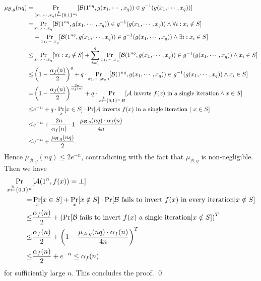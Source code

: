 \begin{align*}
\mu_{\mathcal{B},g}(nq) =& \Pr_{(x_1, \cdots, x_q) \stackrel{\$}{\leftarrow} \{0,1\}^{nq}}[ \mathcal{B}(1^{nq}, g(x_1, \cdots, x_q)) \in g^{-1}(g(x_1, \cdots, x_q))]\\
=&  \Pr_{x_1, \cdots, x_q}[ \mathcal{B}(1^{nq}, g(x_1, \cdots, x_q)) \in g^{-1}(g(x_1, \cdots, x_q)) \wedge \forall i: x_i \notin S]\\
& + \Pr_{x_1, \cdots, x_q}[ \mathcal{B}(1^{nq}, g(x_1, \cdots, x_q)) \in g^{-1}(g(x_1, \cdots, x_q)) \wedge \exists i: x_i \in S]\\
\leq& \Pr_{x_1, \cdots, x_q}[ \forall i: x_i \notin S]
+ \sum_{i=1}^q \Pr_{x_1, \cdots, x_q}[ \mathcal{B}(1^{nq}, g(x_1, \cdots, x_q)) \in g^{-1}(g(x_1, \cdots, x_q)) \wedge  x_i \in S]\\
\leq& \left( 1-\frac{\alpha_f(n)}{2}\right)^q
+ q \cdot \Pr_{x_1, \cdots, x_q,i}[ \mathcal{B}(1^{nq}, g(x_1, \cdots, x_q)) \in g^{-1}(g(x_1, \cdots, x_q)) \wedge x_i \in S] \\
=& \left( 1-\frac{\alpha_f(n)}{2}\right)^{\frac{2n}{\alpha_f(n)}}
+  q\cdot \Pr_{x \stackrel{\$}{\leftarrow} \{0,1\}^{n}, \mathcal{B}}[\mathcal{A} \text{ inverts $f(x)$ in a single iteration}  \wedge x \in S]\\
\leq& e^{-n} + q\cdot  \Pr_{x}[x \in S] \cdot \Pr[\mathcal{A} \text{ inverts $f(x)$ in a single iteration} ~|~ x \in S]\\
\leq& e^{-n} + \frac{2n}{\alpha_f(n)} \cdot  1 \cdot \frac{\mu_{\mathcal{B},g}(nq) \cdot \alpha_f(n)}{4n}\\
\leq& e^{-n} + \frac{\mu_{\mathcal{B},g}(nq)}{2}.
\end{align*}
Hence $\mu_{\mathcal{B},g}(nq) \leq 2 e^{-n}$, contradicting with the fact that $\mu_{\mathcal{B},g}$ is non-negligible.
Then we have
\begin{align*}
\Pr_{x \stackrel{\$}{\leftarrow} \{0,1\}^{n}}&[ \mathcal{A}(1^n, f(x)) = \bot]\\
=& \Pr_x[x \in S] + \Pr_x [x \notin S]\cdot\Pr[\mathcal{B} \text{ fails to invert $f(x)$ in every iteration} | x \notin S]\\
\leq& \frac{\alpha_f(n)}{2}+ \left(\Pr[ \mathcal{B} \text{ fails to invert $f(x)$ a single iteration} | x \notin S] \right)^T\\
\leq & \frac{\alpha_f(n)}{2}+ \left( 1-\frac{\mu_{\mathcal{A},g}(nq) \cdot \alpha_f(n)}{4n}\right)^T\\
\leq& \frac{\alpha_f(n)}{2} + e^{-n} \leq \alpha_f(n)
\end{align*}
for sufficiently large $n$. This concludes the proof.
\qed



